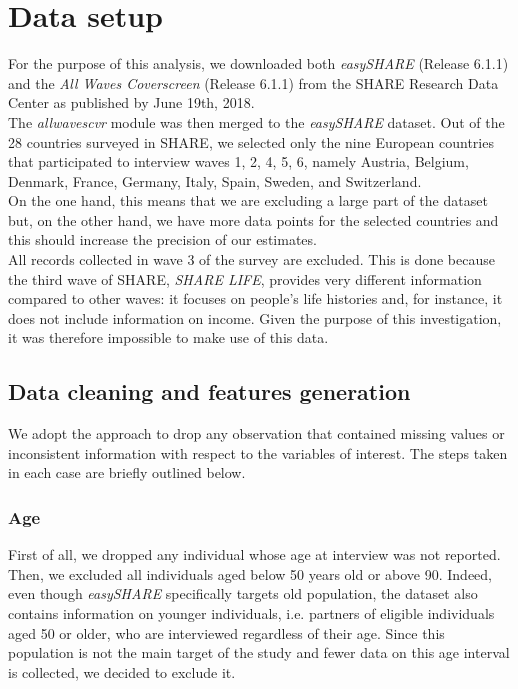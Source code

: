 \section{Data setup}
For the purpose of this analysis, we downloaded both \textit{easySHARE} (Release 6.1.1) and the \textit{All Waves Coverscreen} (Release 6.1.1) from the SHARE Research Data Center as published by June 19th, 2018.\\

The \textit{allwaves\textunderscore cv\textunderscore r} module was then merged to the \textit{easySHARE} dataset.
Out of the 28 countries surveyed in SHARE, we selected only the nine European countries that participated to interview waves 1, 2, 4, 5, 6, namely Austria, Belgium, Denmark, France, Germany, Italy, Spain, Sweden, and Switzerland.\\
On the one hand, this means that we are excluding a large part of the dataset but, on the other hand, we have more data points for the selected countries and this should increase the precision of our estimates.\\


All records collected in wave 3 of the survey are excluded. This is done because the third wave of SHARE, \textit{SHARE LIFE}, provides very different information compared to other waves: it focuses on people's life histories and, for instance, it does not include information on income. Given the purpose of this investigation, it was therefore impossible to make use of this data.

\subsection{Data cleaning and features generation}

We adopt the approach to drop any observation that contained missing values or inconsistent information with respect to the variables of interest.
The steps taken in each case are briefly outlined below.

\subsubsection{Age}
First of all, we dropped any individual whose age at interview was not reported. Then, we excluded all individuals aged below 50 years old or above 90.
Indeed, even though \textit{easySHARE} specifically targets old population,  the dataset  also  contains  information on  younger  individuals,  i.e. partners  of  eligible  individuals  aged  50  or  older,  who  are interviewed regardless of their age. Since this population is not the main target of the study and fewer data on this age interval is collected, we decided to exclude it. \\

